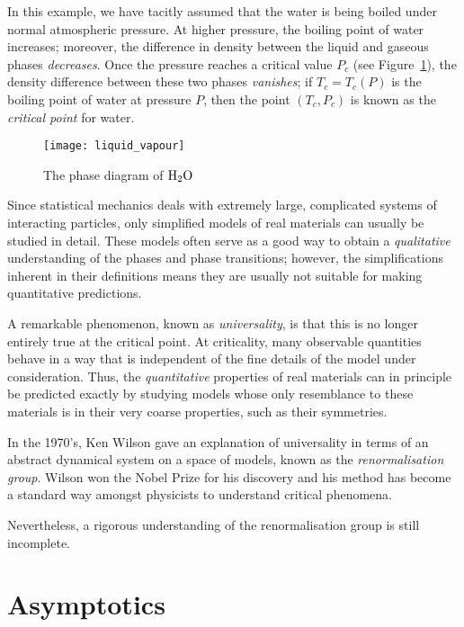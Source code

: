 In this example,
we have tacitly assumed that the water is being boiled under normal atmospheric
pressure. At higher pressure, the boiling point of water increases; moreover,
the difference in density between the liquid and gaseous phases \emph{decreases}.
Once the pressure reaches a critical value $P_c$ (see Figure~\ref{fig:liquid-vapour}),
the density difference between
these two phases \emph{vanishes}; if $T_c = T_c(P)$ is the boiling point of water
at pressure $P$, then the point $(T_c, P_c)$ is known as the \emph{critical point}
for water.

\begin{figure}
\centering
\label{fig:liquid-vapour}
\texttt{[image: liquid\_vapour]}
\caption{The phase diagram of $\rm H_2 O$}
\end{figure}

Since statistical mechanics deals with extremely large, complicated systems of
interacting particles, only simplified models of real materials can usually be
studied in detail. These models often serve as a good way to obtain a
\emph{qualitative} understanding of the phases and phase transitions; however,
the simplifications inherent in their definitions means they are usually not
suitable for making quantitative predictions.

A remarkable phenomenon, known as \emph{universality}, is that this is no longer
entirely true at the critical point. At criticality, many observable quantities
behave in a way that is independent of the fine details of the model under
consideration. Thus, the \emph{quantitative} properties of real materials can in
principle be predicted exactly by studying models whose only resemblance to these
materials is in their very coarse properties, such as their symmetries.

In the 1970's, Ken Wilson gave an explanation of universality in terms of an
abstract dynamical system on a space of models, known as the \emph{renormalisation
group}. Wilson won the Nobel Prize for his discovery and his method has become
a standard way amongst physicists to understand critical phenomena.

Nevertheless, a rigorous understanding of the renormalisation group is still
incomplete.


\section{Asymptotics}

